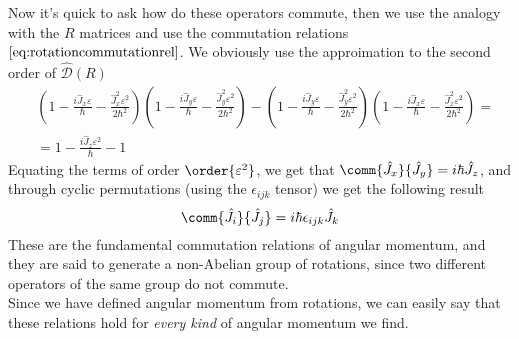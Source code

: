 \documentclass[a4paper, 11pt]{book}
\newcommand{\1}{\opr{\mathds{1}}}
\newcommand{\opr}[1]{\hat{#1}}
\newcommand{\lc}[1]{\epsilon_{#1}}
\newcommand{\mc}[1]{\mathcal{#1}}
\theoremstyle{plain}
\begin{document}
	Now it's quick to ask how do these operators commute, then we use the analogy with the $R$ matrices and use the commutation relations $\eqref{eq:rotationcommutationrel}$. We obviously use the approimation to the second order of $\opr{\mc{D}}(R)$
	\begin{equation*}
		\begin{aligned}
			&\left( 1-\frac{i\opr{J}_x\varepsilon}{\hbar}-\frac{\opr{J}_x^2\varepsilon^2}{2\hbar^2} \right)\left( 1-\frac{i\opr{J}_y\varepsilon}{\hbar}-\frac{\opr{J}_y^2\varepsilon^2}{2\hbar^2} \right)-\left( 1-\frac{i\opr{J}_y\varepsilon}{\hbar}-\frac{\opr{J}_y^2\varepsilon^2}{2\hbar^2} \right)\left( 1-\frac{i\opr{J}_x\varepsilon}{\hbar}-\frac{\opr{J}_x^2\varepsilon^2}{2\hbar^2} \right)=\\
			&= 1-\frac{i\opr{J}_z\varepsilon^2}{\hbar}-1
		\end{aligned}
	\end{equation*}
	Equating the terms of order $\order{\varepsilon^2}$, we get that $\comm{\opr{J}_x}{\opr{J}_y}=i\hbar\opr{J}_z$, and through cyclic permutations (using the $\lc{ijk}$ tensor) we get the following result
	\begin{equation}
		\comm{\opr{J}_i}{\opr{J}_j}=i\hbar\lc{ijk}\opr{J}_k
		\label{eq:commrelangmom}
	\end{equation}
	These are the fundamental commutation relations of angular momentum, and they are said to generate a non-Abelian group of rotations, since two different operators of the same group do not commute.\\
	Since we have defined angular momentum from rotations, we can easily say that these relations hold for \emph{every kind} of angular momentum we find.
\end{document}
